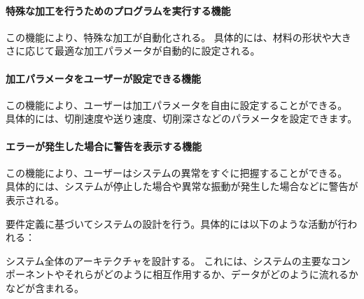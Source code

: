 \paragraph*{特殊な加工を行うためのプログラムを実行する機能}
この機能により、特殊な加工が自動化される。
具体的には、材料の形状や大きさに応じて最適な加工パラメータが自動的に設定される。

\paragraph*{加工パラメータをユーザーが設定できる機能}
この機能により、ユーザーは加工パラメータを自由に設定することができる。
具体的には、切削速度や送り速度、切削深さなどのパラメータを設定できます。

\paragraph*{エラーが発生した場合に警告を表示する機能}
この機能により、ユーザーはシステムの異常をすぐに把握することができる。
具体的には、システムが停止した場合や異常な振動が発生した場合などに警告が表示される。










要件定義に基づいてシステムの設計を行う。具体的には以下のような活動が行われる：



システム全体のアーキテクチャを設計する。
これには、システムの主要なコンポーネントやそれらがどのように相互作用するか、データがどのように流れるかなどが含まれる。



